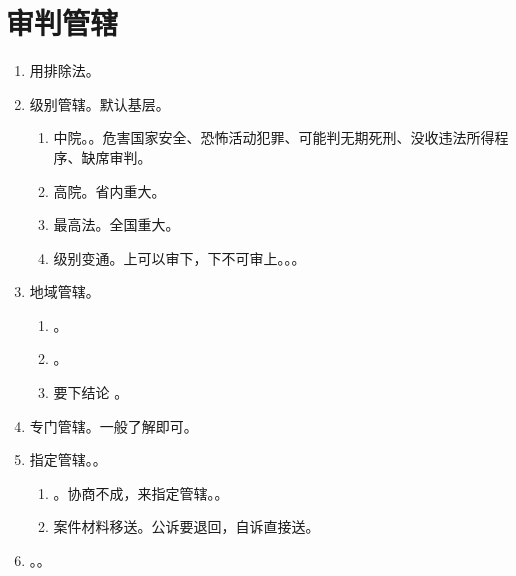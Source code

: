 \section{审判管辖}
\begin{enumerate}
  \item 用排除法。
  \item 级别管辖。默认基层。
        \begin{enumerate}
          \item 中院。。危害国家安全、恐怖活动犯罪、可能判无期死刑、没收违法所得程序、缺席审判。
          \item 高院。省内重大。
          \item 最高法。全国重大。
          \item 级别变通。上可以审下，下不可审上。。。
        \end{enumerate}
  \item 地域管辖。
        \begin{enumerate}
          \item {}。
          \item {}。
          \item 要下结论 \yjt {}。
        \end{enumerate}
  \item 专门管辖。一般了解即可。
  \item 指定管辖。。
        \begin{enumerate}
          \item {}。协商不成，来指定管辖。。
          \item 案件材料移送。公诉要退回，自诉直接送。
        \end{enumerate}
  \item {}。。
\end{enumerate}
